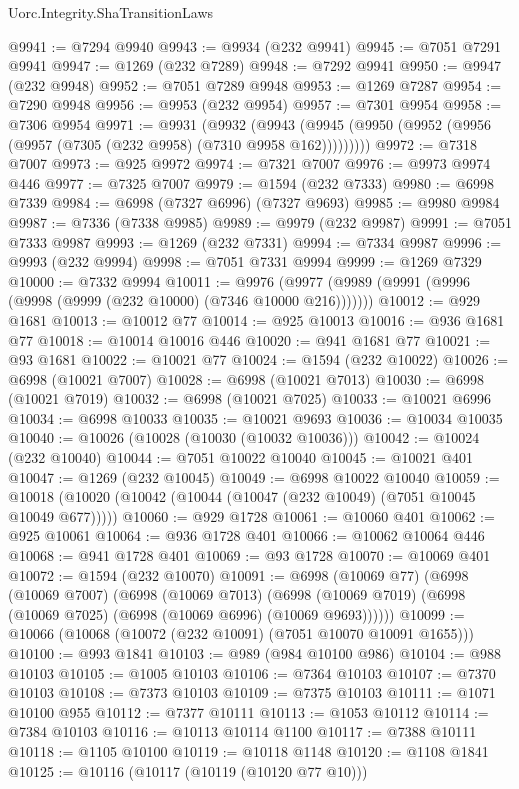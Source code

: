 \begin{lexlean}{Uorc.Integrity.ShaTransitionLaws}
\begin{coremodule}
@9941 := @7294 @9940
@9943 := @9934 (@232 @9941)
@9945 := @7051 @7291 @9941
@9947 := @1269 (@232 @7289)
@9948 := @7292 @9941
@9950 := @9947 (@232 @9948)
@9952 := @7051 @7289 @9948
@9953 := @1269 @7287
@9954 := @7290 @9948
@9956 := @9953 (@232 @9954)
@9957 := @7301 @9954
@9958 := @7306 @9954
@9971 := @9931
    (@9932 (@9943 (@9945 (@9950 (@9952 (@9956 (@9957 (@7305 (@232 @9958) (@7310 @9958 @162)))))))))
@9972 := @7318 @7007
@9973 := @925 @9972
@9974 := @7321 @7007
@9976 := @9973 @9974 @446
@9977 := @7325 @7007
@9979 := @1594 (@232 @7333)
@9980 := @6998 @7339
@9984 := @6998 (@7327 @6996) (@7327 @9693)
@9985 := @9980 @9984
@9987 := @7336 (@7338 @9985)
@9989 := @9979 (@232 @9987)
@9991 := @7051 @7333 @9987
@9993 := @1269 (@232 @7331)
@9994 := @7334 @9987
@9996 := @9993 (@232 @9994)
@9998 := @7051 @7331 @9994
@9999 := @1269 @7329
@10000 := @7332 @9994
@10011 := @9976 (@9977 (@9989 (@9991 (@9996 (@9998 (@9999 (@232 @10000) (@7346 @10000 @216)))))))
@10012 := @929 @1681
@10013 := @10012 @77
@10014 := @925 @10013
@10016 := @936 @1681 @77
@10018 := @10014 @10016 @446
@10020 := @941 @1681 @77
@10021 := @93 @1681
@10022 := @10021 @77
@10024 := @1594 (@232 @10022)
@10026 := @6998 (@10021 @7007)
@10028 := @6998 (@10021 @7013)
@10030 := @6998 (@10021 @7019)
@10032 := @6998 (@10021 @7025)
@10033 := @10021 @6996
@10034 := @6998 @10033
@10035 := @10021 @9693
@10036 := @10034 @10035
@10040 := @10026 (@10028 (@10030 (@10032 @10036)))
@10042 := @10024 (@232 @10040)
@10044 := @7051 @10022 @10040
@10045 := @10021 @401
@10047 := @1269 (@232 @10045)
@10049 := @6998 @10022 @10040
@10059 := @10018 (@10020 (@10042 (@10044 (@10047 (@232 @10049) (@7051 @10045 @10049 @677)))))
@10060 := @929 @1728
@10061 := @10060 @401
@10062 := @925 @10061
@10064 := @936 @1728 @401
@10066 := @10062 @10064 @446
@10068 := @941 @1728 @401
@10069 := @93 @1728
@10070 := @10069 @401
@10072 := @1594 (@232 @10070)
@10091 := @6998
    (@10069 @77)
    (@6998
      (@10069 @7007)
      (@6998
        (@10069 @7013)
        (@6998 (@10069 @7019) (@6998 (@10069 @7025) (@6998 (@10069 @6996) (@10069 @9693))))))
@10099 := @10066 (@10068 (@10072 (@232 @10091) (@7051 @10070 @10091 @1655)))
@10100 := @993 @1841
@10103 := @989 (@984 @10100 @986)
@10104 := @988 @10103
@10105 := @1005 @10103
@10106 := @7364 @10103
@10107 := @7370 @10103
@10108 := @7373 @10103
@10109 := @7375 @10103
@10111 := @1071 @10100 @955
@10112 := @7377 @10111
@10113 := @1053 @10112
@10114 := @7384 @10103
@10116 := @10113 @10114 @1100
@10117 := @7388 @10111
@10118 := @1105 @10100
@10119 := @10118 @1148
@10120 := @1108 @1841
@10125 := @10116 (@10117 (@10119 (@10120 @77 @10)))

\end{coremodule}
\end{lexlean}
